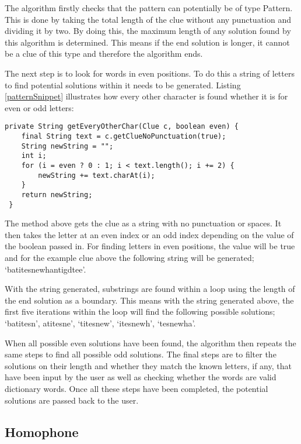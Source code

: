 The algorithm firstly checks that the pattern can potentially be of type 
Pattern. This is done by taking the total length of the clue without any 
punctuation and dividing it by two. By doing this, the maximum length 
of any solution found by this algorithm is determined. This means  if the
 end solution is longer, it cannot be a clue of this type and therefore the
 algorithm ends. 

The next step is to look for words in even positions. To do this a string of
 letters to find potential solutions within it needs to be generated. 
 Listing \ref{patternSnippet} illustrates how every other character is found 
whether it is for even or odd letters:

\begin{lstlisting}[caption={Retrieving every other character from a string},
                   label=patternSnippet] 
 private String getEveryOtherChar(Clue c, boolean even) {
	final String text = c.getClueNoPunctuation(true);
	String newString = "";
	int i;
	for (i = even ? 0 : 1; i < text.length(); i += 2) {
		newString += text.charAt(i);
	}
	return newString;
 }
\end{lstlisting}

The method above gets the clue as a string with no punctuation or spaces.
It then takes the letter at an even index or an odd index depending on 
the value of the boolean passed in. For finding letters in even positions, 
the value will be true and for the example clue above the following string 
will be generated; `batitesnewhantigdtee'. 

With the string generated, substrings are found within a loop using 
the length of the end solution as a boundary. This means with the 
string generated above, the first five iterations within the loop will 
find the following possible solutions; `batitesn', atitesne', `titesnew', 
`itesnewh', `tesnewha'. 

When all possible even solutions have been found, the algorithm then 
repeats the same steps to find all possible odd solutions. The final steps 
are to filter the solutions on their length and whether they match the known 
letters, if any, that have been input by the user as well as checking 
whether the words are valid dictionary words. Once all these steps 
have been completed, the potential solutions are passed back to the user. 

\subsection{Homophone}

